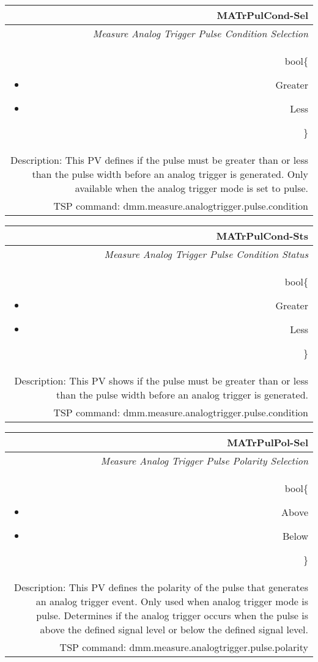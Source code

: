\documentclass[openany]{article}
\begin{document}
		\begin{tabular}{N}
			\hline
			\bfseries MATrPulCond-Sel\label{pv:matrpulcond-sel} \\ \hline
			\emph{Measure Analog Trigger Pulse Condition Selection} \\
			bool\{\begin{itemize}[noitemsep]
				\small
				\item[] Greater
				\item[] Less
			\end{itemize}\} \\
			Description: This PV defines if the pulse must be greater than or less than the pulse width before an analog trigger is generated. Only available when the analog trigger mode is set to pulse. \\
			TSP command: dmm.measure.analogtrigger.pulse.condition
		\end{tabular}

		\begin{tabular}{N}
			\hline
			\bfseries MATrPulCond-Sts\label{pv:matrpulcond-sts} \\ \hline
			\emph{Measure Analog Trigger Pulse Condition Status} \\
			bool\{\begin{itemize}[noitemsep]
				\small
				\item[] Greater
				\item[] Less
			\end{itemize}\} \\
			Description: This PV shows if the pulse must be greater than or less than the pulse width before an analog trigger is generated. \\
			TSP command: dmm.measure.analogtrigger.pulse.condition
		\end{tabular}

		\begin{tabular}{N}
			\hline
			\bfseries MATrPulPol-Sel\label{pv:matrpulpol-sel} \\ \hline
			\emph{Measure Analog Trigger Pulse Polarity Selection} \\
			bool\{\begin{itemize}[noitemsep]
				\small
				\item[] Above
				\item[] Below
			\end{itemize}\} \\
			Description: This PV defines the polarity of the pulse that generates an analog trigger event. Only used when analog trigger mode is pulse. Determines if the analog trigger occurs when the pulse is above the defined signal level or below the defined signal level. \\
			TSP command: dmm.measure.analogtrigger.pulse.polarity
		\end{tabular}
\end{document}
